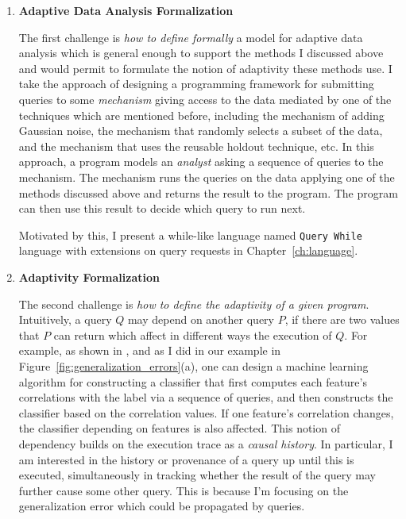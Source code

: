\begin{enumerate}
 \item
 \textbf{Adaptive Data Analysis Formalization}

The first challenge is \emph{how to define formally} a model for adaptive data analysis which is general enough to support the methods I discussed above and would permit to formulate the notion of adaptivity these methods use. 
I take the approach of designing a programming framework for submitting queries to some \emph{mechanism} giving access 
to the data mediated by one of the techniques which are mentioned before, 
including the mechanism of adding Gaussian noise, 
the mechanism that randomly selects a subset of the data, 
and the mechanism that uses the reusable holdout technique, etc. 
In this approach, a program models an \emph{analyst} asking a sequence of queries to the mechanism. 
The mechanism runs the queries on the data applying one of the methods discussed above and returns the result to the program. The program can then use this result to decide which query to run next. 

Motivated by this, I present a while-like language 
named {\tt Query While} language with extensions on query requests in Chapter~\ref{ch:language}.

\item 
\textbf{Adaptivity Formalization}

The second challenge is \emph{how to define the adaptivity of a given program}.
Intuitively, a query $Q$ may depend on another query $P$, if there are two values that $P$ can return which affect in different ways the execution of $Q$. 
For example, as shown in \cite{stoc/DworkFHPRR15}, and as I did in our example in Figure~\ref{fig:generalization_errors}(a), one can design a machine learning algorithm for constructing a classifier that first computes each feature's correlations with the label via a sequence of queries, and then constructs the classifier based on the correlation values. 
If one feature's correlation changes, the classifier depending on features is also affected. 
This notion of dependency builds on the execution trace as a \emph{causal history}. 
In particular, I am interested in the history or provenance of a query up until this is executed, 
simultaneously in tracking whether the result of the query may further cause some other query. 
This is because I'm focusing on the generalization error which could be propagated by queries.


\end{enumerate}
